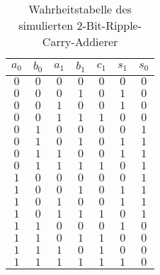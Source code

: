 \documentclass[
    paper=a4,
]{scrartcl}
\begin{document}
        \begin{table}[h]
            \centering
            \caption{Wahrheitstabelle des simulierten 2-Bit-Ripple-Carry-Addierer}
            \label{tab:3}
            \begin{tabular}{cccc|ccc}\toprule
                $a_0$&$b_0$&$a_1$&$b_1$&$c_1$&$s_1$&$s_0$\\\toprule
                $0$&$0$&$0$&$0$&$0$&$0$&$0$\\
                $0$&$0$&$0$&$1$&$0$&$1$&$0$\\
                $0$&$0$&$1$&$0$&$0$&$1$&$0$\\
                $0$&$0$&$1$&$1$&$1$&$0$&$0$\\
                $0$&$1$&$0$&$0$&$0$&$0$&$1$\\
                $0$&$1$&$0$&$1$&$0$&$1$&$1$\\
                $0$&$1$&$1$&$0$&$0$&$1$&$1$\\
                $0$&$1$&$1$&$1$&$1$&$0$&$1$\\
                $1$&$0$&$0$&$0$&$0$&$0$&$1$\\
                $1$&$0$&$0$&$1$&$0$&$1$&$1$\\
                $1$&$0$&$1$&$0$&$0$&$1$&$1$\\
                $1$&$0$&$1$&$1$&$1$&$0$&$1$\\
                $1$&$1$&$0$&$0$&$0$&$1$&$0$\\
                $1$&$1$&$0$&$1$&$1$&$0$&$0$\\
                $1$&$1$&$1$&$0$&$1$&$0$&$0$\\
                $1$&$1$&$1$&$1$&$1$&$1$&$0$\\\bottomrule    
                \end{tabular}
            \end{table}
\end{document}
